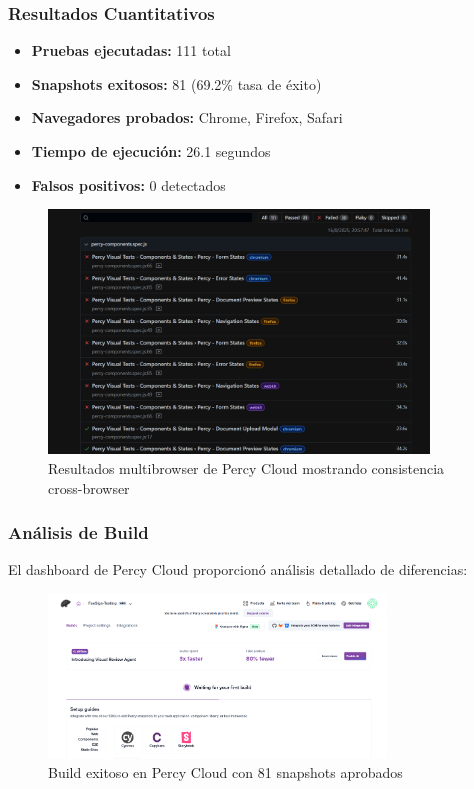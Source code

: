 \documentclass{article}
\begin{document}
\subsubsection{Resultados Cuantitativos}
\begin{itemize}[nosep]
\item \textbf{Pruebas ejecutadas:} 111 total
\item \textbf{Snapshots exitosos:} 81 (69.2\% tasa de éxito)
\item \textbf{Navegadores probados:} Chrome, Firefox, Safari
\item \textbf{Tiempo de ejecución:} 26.1 segundos
\item \textbf{Falsos positivos:} 0 detectados
\end{itemize}

\begin{figure}[H]
\centering
\includegraphics[width=0.9\textwidth]{percy/multibrowser.png}
\caption{Resultados multibrowser de Percy Cloud mostrando consistencia cross-browser}
\label{fig:percy-multibrowser}
\end{figure}

\subsubsection{Análisis de Build}
El dashboard de Percy Cloud proporcionó análisis detallado de diferencias:

\begin{figure}[H]
\centering
\includegraphics[width=0.8\textwidth]{percy/BuildProject.png}
\caption{Build exitoso en Percy Cloud con 81 snapshots aprobados}
\label{fig:percy-build}
\end{figure}
\end{document}
